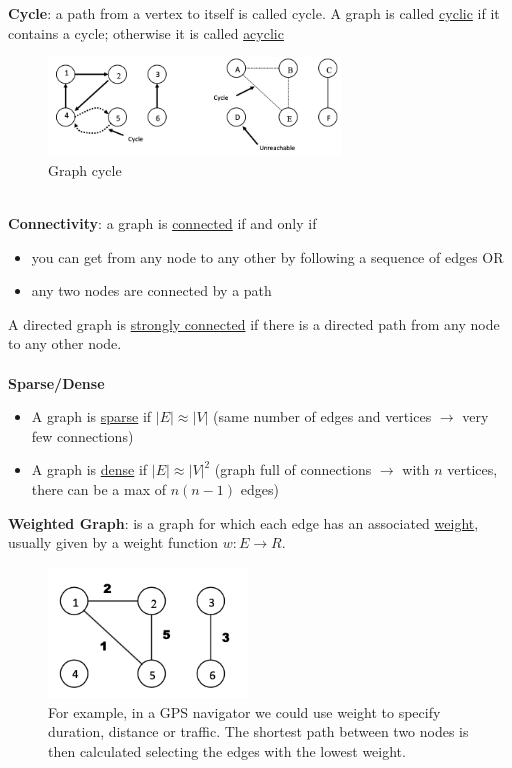 \documentclass[10pt,a4paper]{article}
\newcommand{\nline}{\\~\\}
\begin{document}
\textbf{Cycle}: a path from a vertex to itself is called cycle. A graph is called \uline{cyclic} if it contains a cycle; otherwise it is called \uline{acyclic}
\begin{figure}[h!]
 \hfill \includegraphics[width=220pt]{images/graph-cycle.png}\hspace*{\fill}
  \caption{Graph cycle}
\end{figure} \\
\textbf{Connectivity}: a graph is \uline{connected} if and only if
\begin{itemize}
	\item you can get from any node to any other by following a sequence of edges OR
	\item any two nodes are connected by a path
\end{itemize}
A directed graph is \uline{strongly connected} if there is a directed path from any node to any other node. \nline
\textbf{Sparse/Dense}
\begin{itemize}
	\item A graph is \uline{sparse} if $|E| \approx |V|$ (same number of edges and vertices $\rightarrow$ very few connections)
	\item A graph is \uline{dense} if $|E| \approx |V|^2$ (graph full of connections $\rightarrow$ with $n$ vertices, there can be a max of $n(n-1)$ edges)
\end{itemize}
 \pagebreak
\textbf{Weighted Graph}: is a graph for which each edge has an associated \uline{weight}, usually given by a weight function $w:E\rightarrow R$.
\begin{figure}[h!]
 \hfill \includegraphics[width=150pt]{images/graph-weight.png}\hspace*{\fill}
  \caption{For example, in a GPS navigator we could use weight to specify duration, distance or traffic. The shortest path between two nodes is then calculated selecting the edges with the lowest weight.}
\end{figure}  \\
\end{document}
